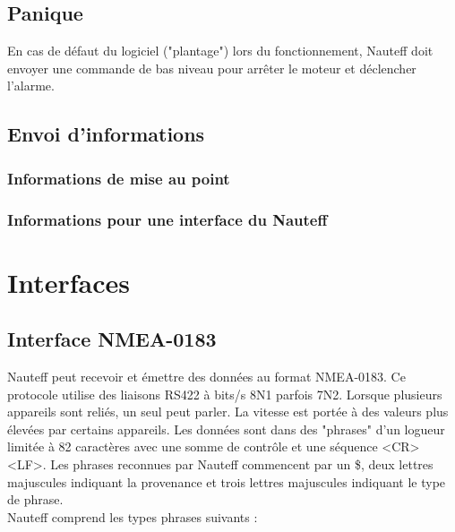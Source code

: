 \documentclass[a4paper,11pt]{report}
\begin{document}
\section{Panique}
En cas de défaut du logiciel ("plantage") lors du fonctionnement, Nauteff doit envoyer une commande de bas niveau pour arrêter le moteur
et déclencher l'alarme.

 
\section{Envoi d'informations}
\subsection{Informations de mise au point}
\subsection{Informations pour une interface du Nauteff}

\chapter{Interfaces}
\section{Interface NMEA-0183}
Nauteff peut recevoir et émettre des données au format NMEA-0183.
Ce protocole utilise des liaisons RS422 à  bits/s 8N1 parfois 7N2.
Lorsque plusieurs appareils sont reliés, un seul peut parler. 
La vitesse est portée à des valeurs plus élevées par certains appareils.
Les données sont dans des "phrases" d'un logueur limitée à 82 caractères
avec une somme de contrôle et une séquence <CR><LF>.
Les phrases reconnues par Nauteff commencent
par un \$, deux lettres majuscules indiquant la provenance
et trois lettres majuscules indiquant le type de phrase.
\\

Nauteff comprend les types phrases suivants :
\end{document}
